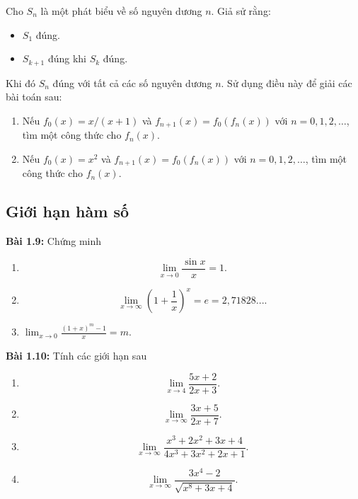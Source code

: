 Cho $S_n$ là một phát biểu về số nguyên dương $n$. Giả sử rằng:
\begin{itemize}
    \item $S_1$ đúng.
    \item $S_{k+1}$ đúng khi $S_k$ đúng.
\end{itemize}
Khi đó $S_n$ đúng với tất cả các số nguyên dương $n$.\newline
Sử dụng điều này để giải các bài toán sau:
\begin{enumerate}[label=(\alph*)]
\item Nếu $f_0(x) =x/(x+1)$ và $f_{n+1}(x)=f_0(f_n(x))$ với $n=0, 1, 2,\dots$, tìm một công thức cho $f_n(x)$.
\item Nếu $f_0(x) =x^2$ và $f_{n+1}(x)=f_0(f_n(x))$ với $n=0, 1, 2,\dots$, tìm một công thức cho $f_n(x)$.
\end{enumerate}
\subsection*{Giới hạn hàm số}
\textbf{Bài 1.9:} Chứng minh
\begin{enumerate}[label=(\alph*)]
    \item $$\lim_{x\rightarrow 0}\frac{\sin x}{x}=1.$$
    \item $$\lim_{x\rightarrow\infty}\left(1+\frac{1}{x}\right)^x =e=2,71828... .$$
    \item $\lim_{x\rightarrow 0}\frac{(1+x)^m -1}{x}=m.$
\end{enumerate}
\vspace{5pt}

\textbf{Bài 1.10:} Tính các giới hạn sau 
\begin{enumerate}[label=(\alph*)]
    \item $$\lim_{x\rightarrow 4}\frac{5x+2}{2x+3}.$$
    \item $$\lim_{x\rightarrow \infty}\frac{3x+5}{2x+7} .$$
    \item $$\lim_{x\rightarrow\infty}\frac{x^3 +2x^2 +3x+4}{4x^3 +3x^2 +2x+1}.$$
    \item $$\lim_{x\rightarrow\infty}\frac{3x^4 -2}{\sqrt{x^8+3x+4}}.$$
\end{enumerate}
